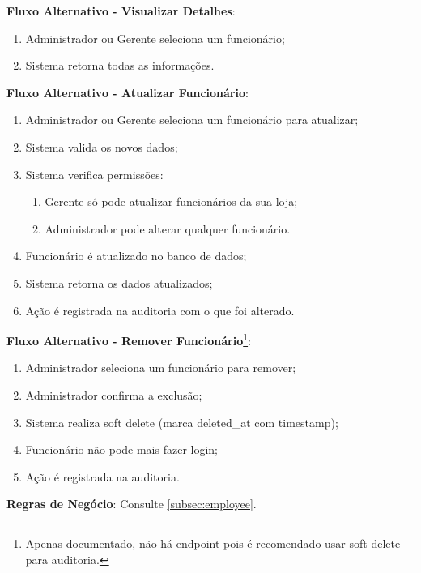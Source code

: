 \begin{itemize}[topsep=1pt, itemsep=0pt]
  \textbf{Fluxo Alternativo - Visualizar Detalhes}:
  \begin{enumerate}
    \item Administrador ou Gerente seleciona um funcionário;
    \item Sistema retorna todas as informações.
  \end{enumerate}

  \textbf{Fluxo Alternativo - Atualizar Funcionário}:
  \begin{enumerate}
    \item Administrador ou Gerente seleciona um funcionário para atualizar;
    \item Sistema valida os novos dados;
    \item Sistema verifica permissões:
    \begin{enumerate}
      \item Gerente só pode atualizar funcionários da sua loja;
      \item Administrador pode alterar qualquer funcionário.
    \end{enumerate}
    \item Funcionário é atualizado no banco de dados;
    \item Sistema retorna os dados atualizados;
    \item Ação é registrada na auditoria com o que foi alterado.
  \end{enumerate}

  \textbf{Fluxo Alternativo - Remover Funcionário}\footnote{Apenas documentado, não há endpoint pois é recomendado usar soft delete para auditoria.}:
  \begin{enumerate}
    \item Administrador seleciona um funcionário para remover;
    \item Administrador confirma a exclusão;
    \item Sistema realiza soft delete (marca deleted\_at com timestamp);
    \item Funcionário não pode mais fazer login;
    \item Ação é registrada na auditoria.
  \end{enumerate}

  \textbf{Regras de Negócio}:
  Consulte \ref{subsec:employee}.
\end{itemize}
